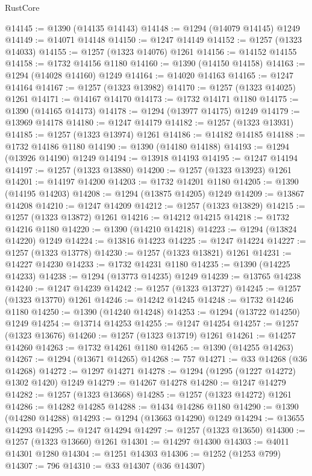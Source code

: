 \begin{lexlean}{RustCore}
\begin{coremodule}
@14145 := @1390 (@14135 @14143)
@14148 := @1294 (@14079 @14145) @1249
@14149 := @14071 @14148
@14150 := @1247 @14149
@14152 := @1257 (@1323 @14033)
@14155 := @1257 (@1323 @14076) @1261
@14156 := @14152 @14155
@14158 := @1732 @14156 @1180
@14160 := @1390 (@14150 @14158)
@14163 := @1294 (@14028 @14160) @1249
@14164 := @14020 @14163
@14165 := @1247 @14164
@14167 := @1257 (@1323 @13982)
@14170 := @1257 (@1323 @14025) @1261
@14171 := @14167 @14170
@14173 := @1732 @14171 @1180
@14175 := @1390 (@14165 @14173)
@14178 := @1294 (@13977 @14175) @1249
@14179 := @13969 @14178
@14180 := @1247 @14179
@14182 := @1257 (@1323 @13931)
@14185 := @1257 (@1323 @13974) @1261
@14186 := @14182 @14185
@14188 := @1732 @14186 @1180
@14190 := @1390 (@14180 @14188)
@14193 := @1294 (@13926 @14190) @1249
@14194 := @13918 @14193
@14195 := @1247 @14194
@14197 := @1257 (@1323 @13880)
@14200 := @1257 (@1323 @13923) @1261
@14201 := @14197 @14200
@14203 := @1732 @14201 @1180
@14205 := @1390 (@14195 @14203)
@14208 := @1294 (@13875 @14205) @1249
@14209 := @13867 @14208
@14210 := @1247 @14209
@14212 := @1257 (@1323 @13829)
@14215 := @1257 (@1323 @13872) @1261
@14216 := @14212 @14215
@14218 := @1732 @14216 @1180
@14220 := @1390 (@14210 @14218)
@14223 := @1294 (@13824 @14220) @1249
@14224 := @13816 @14223
@14225 := @1247 @14224
@14227 := @1257 (@1323 @13778)
@14230 := @1257 (@1323 @13821) @1261
@14231 := @14227 @14230
@14233 := @1732 @14231 @1180
@14235 := @1390 (@14225 @14233)
@14238 := @1294 (@13773 @14235) @1249
@14239 := @13765 @14238
@14240 := @1247 @14239
@14242 := @1257 (@1323 @13727)
@14245 := @1257 (@1323 @13770) @1261
@14246 := @14242 @14245
@14248 := @1732 @14246 @1180
@14250 := @1390 (@14240 @14248)
@14253 := @1294 (@13722 @14250) @1249
@14254 := @13714 @14253
@14255 := @1247 @14254
@14257 := @1257 (@1323 @13676)
@14260 := @1257 (@1323 @13719) @1261
@14261 := @14257 @14260
@14263 := @1732 @14261 @1180
@14265 := @1390 (@14255 @14263)
@14267 := @1294 (@13671 @14265)
@14268 := 757
@14271 := @33 @14268 (@36 @14268)
@14272 := @1297 @14271
@14278 := @1294 (@1295 (@1227 @14272) @1302 @1420) @1249
@14279 := @14267 @14278
@14280 := @1247 @14279
@14282 := @1257 (@1323 @13668)
@14285 := @1257 (@1323 @14272) @1261
@14286 := @14282 @14285
@14288 := @1434 @14286 @1180
@14290 := @1390 (@14280 @14288)
@14293 := @1294 (@13663 @14290) @1249
@14294 := @13655 @14293
@14295 := @1247 @14294
@14297 := @1257 (@1323 @13650)
@14300 := @1257 (@1323 @13660) @1261
@14301 := @14297 @14300
@14303 := @4011 @14301 @1280
@14304 := @1251 @14303
@14306 := @1252 (@1253 @799)
@14307 := 796
@14310 := @33 @14307 (@36 @14307)

\end{coremodule}
\end{lexlean}
